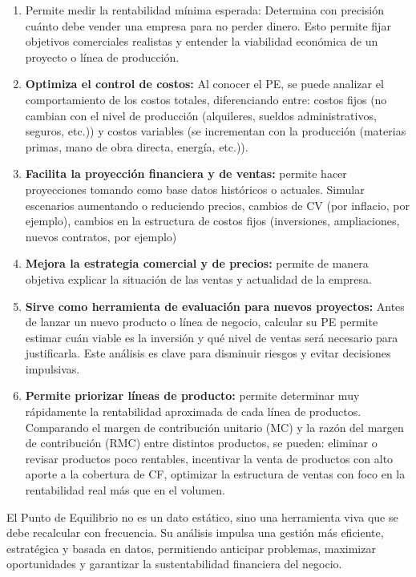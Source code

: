 \documentclass[a4paper,oneside,11pt]{article}
\begin{document}
\begin{enumerate}
    \item Permite medir la rentabilidad mínima esperada: Determina con precisión cuánto debe vender una empresa para no perder dinero. Esto permite fijar objetivos comerciales realistas y entender la viabilidad económica de un proyecto o línea de producción.
    \item \textbf{Optimiza el control de costos:} Al conocer el PE, se puede analizar el comportamiento de los costos totales, diferenciando entre: costos fijos (no cambian con el nivel de producción (alquileres, sueldos administrativos, seguros, etc.)) y costos variables (se incrementan con la producción (materias primas, mano de obra directa, energía, etc.)).
    \item \textbf{Facilita la proyección financiera y de ventas:} permite hacer proyecciones tomando como base datos históricos o actuales. Simular escenarios aumentando o reduciendo precios, cambios de CV (por inflacio, por ejemplo), cambios en la estructura de costos fijos (inversiones, ampliaciones, nuevos contratos, por ejemplo)
    \item \textbf{Mejora la estrategia comercial y de precios:} permite de manera objetiva explicar la situación de las ventas y actualidad de la empresa.
    \item \textbf{Sirve como herramienta de evaluación para nuevos proyectos:} Antes de lanzar un nuevo producto o línea de negocio, calcular su PE permite estimar cuán viable es la inversión y qué nivel de ventas será necesario para justificarla. Este análisis es clave para disminuir riesgos y evitar decisiones impulsivas.
    \item \textbf{Permite priorizar líneas de producto:} permite determinar muy rápidamente la rentabilidad aproximada de cada línea de productos. Comparando el margen de contribución unitario (MC) y la razón del margen de contribución (RMC) entre distintos productos, se pueden: eliminar o revisar productos poco rentables, incentivar la venta de productos con alto aporte a la cobertura de CF, optimizar la estructura de ventas con foco en la rentabilidad real más que en el volumen.
\end{enumerate}

El Punto de Equilibrio no es un dato estático, sino una herramienta viva que se debe recalcular con frecuencia. Su análisis impulsa una gestión más eficiente, estratégica y basada en datos, permitiendo anticipar problemas, maximizar oportunidades y garantizar la sustentabilidad financiera del negocio.
\end{document}
